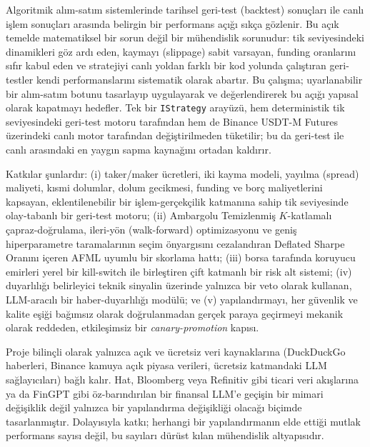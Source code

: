 \documentclass[a4paper, 12pt, titlepage]{article}
\begin{document}
Algoritmik alım-satım sistemlerinde tarihsel geri-test (backtest)
sonuçları ile canlı işlem sonuçları arasında belirgin bir performans
açığı sıkça gözlenir. Bu açık temelde matematiksel bir sorun değil bir
mühendislik sorunudur: tik seviyesindeki dinamikleri göz ardı eden,
kaymayı (slippage) sabit varsayan, funding oranlarını sıfır kabul eden
ve stratejiyi canlı yoldan farklı bir kod yolunda çalıştıran
geri-testler kendi performanslarını sistematik olarak abartır. Bu
çalışma; uyarlanabilir bir alım-satım botunu tasarlayıp uygulayarak
ve değerlendirerek bu açığı yapısal olarak kapatmayı hedefler. Tek
bir \texttt{IStrategy} arayüzü, hem deterministik tik seviyesindeki
geri-test motoru tarafından hem de Binance USDT-M Futures üzerindeki
canlı motor tarafından değiştirilmeden tüketilir; bu da geri-test ile
canlı arasındaki en yaygın sapma kaynağını ortadan kaldırır.

Katkılar şunlardır: (i) taker/maker ücretleri, iki kayma modeli,
yayılma (spread) maliyeti, kısmi dolumlar, dolum gecikmesi, funding
ve borç maliyetlerini kapsayan, eklentilenebilir bir işlem-gerçekçilik
katmanına sahip tik seviyesinde olay-tabanlı bir geri-test motoru;
(ii) Ambargolu Temizlenmiş $K$-katlamalı çapraz-doğrulama, ileri-yön
(walk-forward) optimizasyonu ve geniş hiperparametre taramalarının
seçim önyargısını cezalandıran Deflated Sharpe Oranını içeren AFML
uyumlu bir skorlama hattı; (iii) borsa tarafında koruyucu emirleri
yerel bir kill-switch ile birleştiren çift katmanlı bir risk alt
sistemi; (iv) duyarlılığı belirleyici teknik sinyalin üzerinde
yalnızca bir veto olarak kullanan, LLM-aracılı bir haber-duyarlılığı
modülü; ve (v) yapılandırmayı, her güvenlik ve kalite eşiği bağımsız
olarak doğrulanmadan gerçek paraya geçirmeyi mekanik olarak
reddeden, etkileşimsiz bir \emph{canary-promotion} kapısı.

Proje bilinçli olarak yalnızca açık ve ücretsiz veri kaynaklarına
(DuckDuckGo haberleri, Binance kamuya açık piyasa verileri, ücretsiz
katmandaki LLM sağlayıcıları) bağlı kalır. Hat, Bloomberg veya
Refinitiv gibi ticari veri akışlarına ya da FinGPT gibi öz-barındırılan
bir finansal LLM'e geçişin bir mimari değişiklik değil yalnızca bir
yapılandırma değişikliği olacağı biçimde tasarlanmıştır. Dolayısıyla
katkı; herhangi bir yapılandırmanın elde ettiği mutlak performans
sayısı değil, bu sayıları dürüst kılan mühendislik altyapısıdır.
\end{document}
